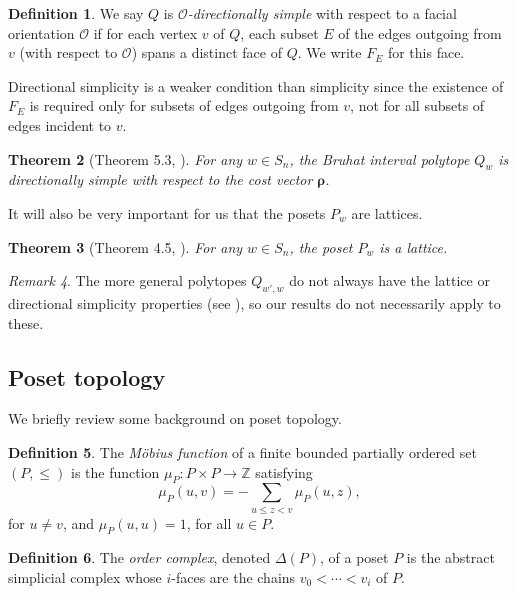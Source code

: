 \documentclass[12pt]{amsart}
\theoremstyle{plain}
\newtheorem{thm}{Theorem}[section]
\theoremstyle{definition}
\newtheorem{defn}[thm]{Definition}
\theoremstyle{remark}
\newtheorem{remark}[thm]{Remark}
\def\integers{{\mathbb Z}}
\begin{document}
\begin{defn}
We say $Q$ is \emph{$\mathcal{O}$-directionally simple} with respect to a facial orientation $\mathcal{O}$ if for each vertex $v$ of $Q$, each subset $E$ of the edges outgoing from $v$ (with respect to $\mathcal{O}$) spans a distinct face of $Q$. We write $F_E$ for this face.
\end{defn}

Directional simplicity is a weaker condition than simplicity since the existence of $F_E$ is required only for subsets of edges outgoing from $v$, not for all subsets of edges incident to $v$.

\begin{thm}[Theorem 5.3, \cite{Ga}]
\label{thm:bip-is-directionally-simple}
For any $w \in S_n$, the Bruhat interval polytope $Q_w$ is directionally simple with respect to the cost vector $\boldsymbol{\rho}$.
\end{thm}

It will also be very important for us that the posets $P_w$ are lattices.

\begin{thm}[Theorem 4.5, \cite{Ga}]
\label{thm:bip-is-lattice}
For any $w \in S_n$, the poset $P_w$ is a lattice.
\end{thm}

\begin{remark}
The more general polytopes $Q_{w',w}$ do not always have the lattice or directional simplicity properties (see \cite[\S1.3.3]{Ga}), so our results do not necessarily apply to these.
\end{remark}


\subsection{Poset topology}

We briefly review some background on poset topology.

\begin{defn}
The {\it M\"obius function} of a finite bounded partially ordered set $(P,\leq)$ is the function $\mu_P : P\times P \rightarrow \integers $ satisfying 
$$\mu_P(u,v) = -\sum_{u\le z < v} \mu_P(u,z),$$
for $u\ne v$, and $\mu_P(u,u)=1$, for all $u \in P$.
\end{defn}


\begin{defn}
The {\it order complex}, denoted $\Delta (P)$, of a poset $P$ is the abstract simplicial complex whose $i$-faces are the chains $v_0 < \cdots < v_i$ of $P$.  
\end{defn}
\end{document}
